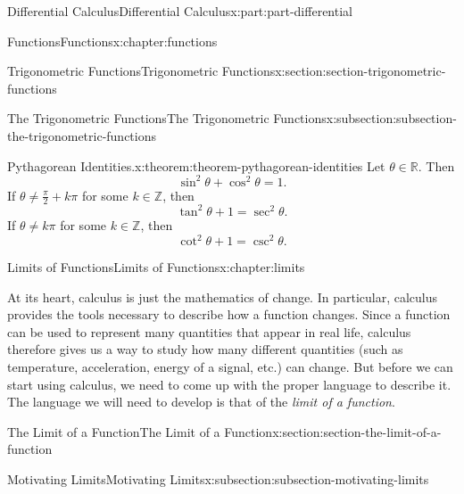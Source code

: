 \documentclass[twoside,10pt,]{book}
\numberwithin{equation}{part}
\newcommand{\RR}{\mathbb{R}}
\newcommand{\ZZ}{\mathbb{Z}}
\begin{document}
\begin{partptx}{Differential Calculus}{}{Differential Calculus}{}{}{x:part:part-differential}
\begin{chapterptx}{Functions}{}{Functions}{}{}{x:chapter:functions}
\begin{sectionptx}{Trigonometric Functions}{}{Trigonometric Functions}{}{}{x:section:section-trigonometric-functions}
\begin{subsectionptx}{The Trigonometric Functions}{}{The Trigonometric Functions}{}{}{x:subsection:subsection-the-trigonometric-functions}
\begin{theorem}{Pythagorean Identities.}{}{x:theorem:theorem-pythagorean-identities}
Let \(\theta\in\RR\). Then%
\begin{equation*}
\sin^2\theta + \cos^2\theta = 1\text{.}
\end{equation*}
If \(\theta\neq\frac{\pi}{2}+k\pi\) for some \(k\in\ZZ\), then%
\begin{equation*}
\tan^2\theta + 1 = \sec^2\theta\text{.}
\end{equation*}
If \(\theta\neq k\pi\) for some \(k\in\ZZ\), then%
\begin{equation*}
\cot^2\theta + 1 = \csc^2\theta\text{.}
\end{equation*}
%
\end{theorem}
\end{subsectionptx}
\end{sectionptx}
\end{chapterptx}
%
\typeout{************************************************}
\typeout{************************************************}
%
\begin{chapterptx}{Limits of Functions}{}{Limits of Functions}{}{}{x:chapter:limits}
\begin{introduction}{}%
At its heart, calculus is just the mathematics of change. In particular, calculus provides the tools necessary to describe how a function changes. Since a function can be used to represent many quantities that appear in real life, calculus therefore gives us a way to study how many different quantities (such as temperature, acceleration, energy of a signal, etc.) can change. But before we can start using calculus, we need to come up with the proper language to describe it. The language we will need to develop is that of the \emph{limit of a function}.%
\end{introduction}%
%
%
\typeout{************************************************}
\typeout{************************************************}
%
\begin{sectionptx}{The Limit of a Function}{}{The Limit of a Function}{}{}{x:section:section-the-limit-of-a-function}
%
%
\typeout{************************************************}
\typeout{************************************************}
%
\begin{subsectionptx}{Motivating Limits}{}{Motivating Limits}{}{}{x:subsection:subsection-motivating-limits}

\end{subsectionptx}
\end{sectionptx}
\end{chapterptx}
\end{partptx}
\end{document}
